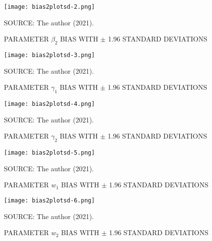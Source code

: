 \begin{figure}[H]
 \setlength{\abovecaptionskip}{.0001pt}
 \caption{PARAMETER \(\beta_{2}\) BIAS WITH \(\pm\) 1.96 STANDARD
         DEVIATIONS}
 \vspace{0.2cm}\centering
 \texttt{[image: bias2plotsd-2.png]}\\
 \begin{footnotesize}
  SOURCE: The author (2021).
 \end{footnotesize}
 \label{fig:biassdbeta2}
\end{figure}

\begin{figure}[H]
 \setlength{\abovecaptionskip}{.0001pt}
 \caption{PARAMETER \(\gamma_{1}\) BIAS WITH \(\pm\) 1.96 STANDARD
          DEVIATIONS}
 \vspace{0.2cm}\centering
 \texttt{[image: bias2plotsd-3.png]}\\
 \begin{footnotesize}
  SOURCE: The author (2021).
 \end{footnotesize}
 \label{fig:biassdgama1}
\end{figure}

\begin{figure}[H]
 \setlength{\abovecaptionskip}{.0001pt}
 \caption{PARAMETER \(\gamma_{2}\) BIAS WITH \(\pm\) 1.96 STANDARD
          DEVIATIONS}
 \vspace{0.2cm}\centering
 \texttt{[image: bias2plotsd-4.png]}\\
 \begin{footnotesize}
  SOURCE: The author (2021).
 \end{footnotesize}
 \label{fig:biassdgama2}
\end{figure}

\begin{figure}[H]
 \setlength{\abovecaptionskip}{.0001pt}
 \caption{PARAMETER \(w_{1}\) BIAS WITH \(\pm\) 1.96 STANDARD DEVIATIONS}
 \vspace{0.2cm}\centering
 \texttt{[image: bias2plotsd-5.png]}\\
 \begin{footnotesize}
  SOURCE: The author (2021).
 \end{footnotesize}
 \label{fig:biassdw1}
\end{figure}

\begin{figure}[H]
 \setlength{\abovecaptionskip}{.0001pt}
 \caption{PARAMETER \(w_{2}\) BIAS WITH \(\pm\) 1.96 STANDARD DEVIATIONS}
 \vspace{0.2cm}\centering
 \texttt{[image: bias2plotsd-6.png]}\\
 \begin{footnotesize}
  SOURCE: The author (2021).
 \end{footnotesize}
 \label{fig:biassdw2}
\end{figure}

